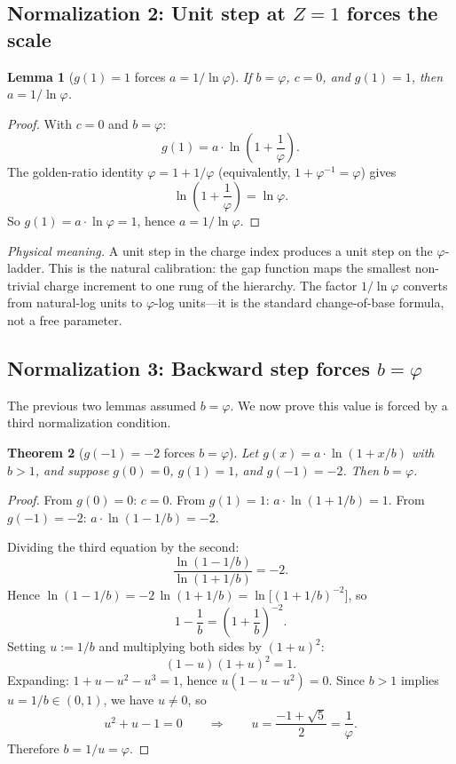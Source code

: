 \documentclass[11pt,a4paper]{article}
\newtheorem{theorem}{Theorem}[section]
\newtheorem{lemma}[theorem]{Lemma}
\theoremstyle{definition}
\theoremstyle{remark}
\newcommand{\phig}{\varphi}
\newcommand{\Zidx}{Z}
\begin{document}
\subsection{Normalization 2: Unit step at $\Zidx = 1$ forces the scale}

\begin{lemma}[$g(1) = 1$ forces $a = 1/\ln\phig$]
\label{lem:gap_a}
If $b = \phig$, $c = 0$, and $g(1) = 1$, then $a = 1/\ln\phig$.
\end{lemma}

\begin{proof}
With $c = 0$ and $b = \phig$:
\[
  g(1) = a \cdot \ln\!\left(1 + \frac{1}{\phig}\right).
\]
The golden-ratio identity $\phig = 1 + 1/\phig$ (equivalently,
$1 + \phig^{-1} = \phig$) gives
\[
  \ln\!\left(1 + \frac{1}{\phig}\right) = \ln \phig.
\]
So $g(1) = a \cdot \ln\phig = 1$, hence $a = 1/\ln\phig$.
\end{proof}

\noindent
\textit{Physical meaning.}\quad
A unit step in the charge index produces a unit step on the $\phig$-ladder.
This is the natural calibration: the gap function maps the smallest non-trivial
charge increment to one rung of the hierarchy.  The factor $1/\ln\phig$
converts from natural-log units to $\phig$-log units---it is the standard
change-of-base formula, not a free parameter.

\subsection{Normalization 3: Backward step forces $b = \phig$}

The previous two lemmas assumed $b = \phig$.  We now prove this value is
forced by a third normalization condition.

\begin{theorem}[$g(-1) = -2$ forces $b = \phig$]
\label{thm:gap_b}
Let $g(x) = a \cdot \ln(1 + x/b)$ with $b > 1$, and suppose $g(0) = 0$,
$g(1) = 1$, and $g(-1) = -2$.  Then $b = \phig$.
\end{theorem}

\begin{proof}
From $g(0) = 0$: $c = 0$.
From $g(1) = 1$: $a \cdot \ln(1 + 1/b) = 1$.
From $g(-1) = -2$: $a \cdot \ln(1 - 1/b) = -2$.

Dividing the third equation by the second:
\[
  \frac{\ln(1 - 1/b)}{\ln(1 + 1/b)} = -2.
\]
Hence $\ln(1 - 1/b) = -2\,\ln(1 + 1/b) = \ln\bigl[(1 + 1/b)^{-2}\bigr]$,
so
\[
  1 - \frac{1}{b} = \left(1 + \frac{1}{b}\right)^{-2}.
\]
Setting $u := 1/b$ and multiplying both sides by $(1+u)^2$:
\[
  (1 - u)(1 + u)^2 = 1.
\]
Expanding: $1 + u - u^2 - u^3 = 1$, hence $u(1 - u - u^2) = 0$.
Since $b > 1$ implies $u = 1/b \in (0, 1)$, we have $u \neq 0$, so
\[
  u^2 + u - 1 = 0 \qquad\Longrightarrow\qquad
  u = \frac{-1 + \sqrt{5}}{2} = \frac{1}{\phig}.
\]
Therefore $b = 1/u = \phig$.
\end{proof}
\end{document}
